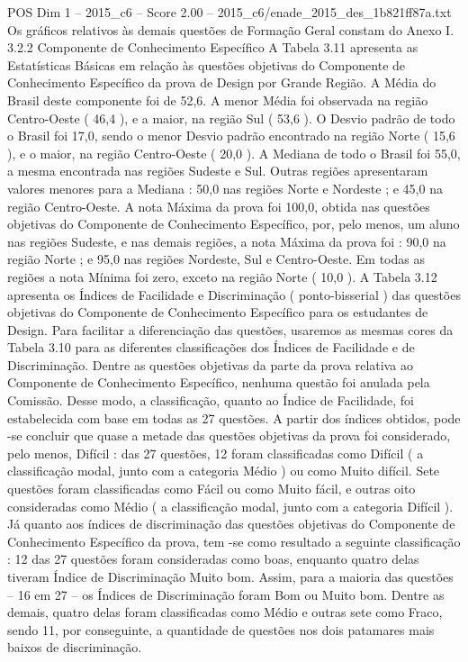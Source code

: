\begin{textsample}{POS Dim 1 – 2015\_c6 – Score 2.00 – 2015\_c6/enade\_2015\_des\_1b821ff87a.txt}
Os gráficos relativos às demais questões de Formação Geral constam do Anexo I. 3.2.2 Componente de Conhecimento Específico A Tabela 3.11 apresenta as Estatísticas Básicas em relação às questões objetivas do Componente de Conhecimento Específico da prova de Design por Grande Região.
A Média do Brasil deste componente foi de 52,6.
A menor Média foi observada na região Centro-Oeste ( 46,4 ), e a maior, na região Sul ( 53,6 ).
O Desvio padrão de todo o Brasil foi 17,0, sendo o menor Desvio padrão encontrado na região Norte ( 15,6 ), e o maior, na região Centro-Oeste ( 20,0 ).
A Mediana de todo o Brasil foi 55,0, a mesma encontrada nas regiões Sudeste e Sul.
Outras regiões apresentaram valores menores para a Mediana : 50,0 nas regiões Norte e Nordeste ; e 45,0 na região Centro-Oeste.
A nota Máxima da prova foi 100,0, obtida nas questões objetivas do Componente de Conhecimento Específico, por, pelo menos, um aluno nas regiões Sudeste, e nas demais regiões, a nota Máxima da prova foi : 90,0 na região Norte ; e 95,0 nas regiões Nordeste, Sul e Centro-Oeste.
Em todas as regiões a nota Mínima foi zero, exceto na região Norte ( 10,0 ).
A Tabela 3.12 apresenta os Índices de Facilidade e Discriminação ( ponto-bisserial ) das questões objetivas do Componente de Conhecimento Específico para os estudantes de Design.
Para facilitar a diferenciação das questões, usaremos as mesmas cores da Tabela 3.10 para as diferentes classificações dos Índices de Facilidade e de Discriminação.
Dentre as questões objetivas da parte da prova relativa ao Componente de Conhecimento Específico, nenhuma questão foi anulada pela Comissão.
Desse modo, a classificação, quanto ao Índice de Facilidade, foi estabelecida com base em todas as 27 questões.
A partir dos índices obtidos, pode -se concluir que quase a metade das questões objetivas da prova foi considerado, pelo menos, Difícil : das 27 questões, 12 foram classificadas como Difícil ( a classificação modal, junto com a categoria Médio ) ou como Muito difícil.
Sete questões foram classificadas como Fácil ou como Muito fácil, e outras oito consideradas como Médio ( a classificação modal, junto com a categoria Difícil ).
Já quanto aos índices de discriminação das questões objetivas do Componente de Conhecimento Específico da prova, tem -se como resultado a seguinte classificação : 12 das 27 questões foram consideradas como boas, enquanto quatro delas tiveram Índice de Discriminação Muito bom.
Assim, para a maioria das questões – 16 em 27 – os Índices de Discriminação foram Bom ou Muito bom.
Dentre as demais, quatro delas foram classificadas como Médio e outras sete como Fraco, sendo 11, por conseguinte, a quantidade de questões nos dois patamares mais baixos de discriminação.

\end{textsample}
